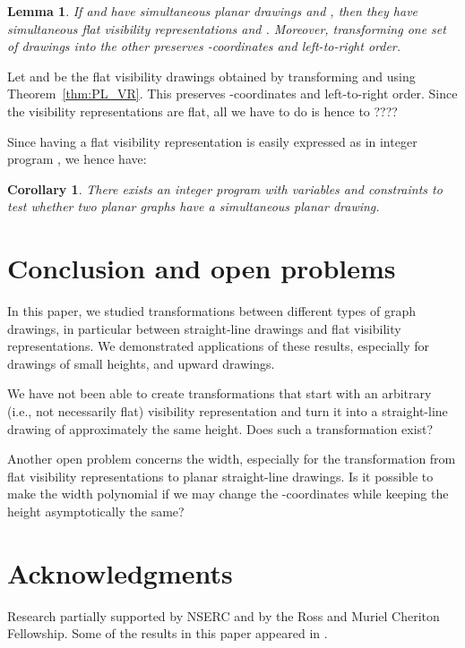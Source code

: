 \documentclass{elsarticle}
\newtheorem{lemma}{Lemma}
\newtheorem{corollary}{Corollary}
\newenvironment{proof}{{\bf Proof: }}{\hspace*{\fill}\medskip}
\begin{document}
\begin{lemma}
\label{lem:SL_VR_simultaneous}
If  and  have simultaneous planar drawings  and ,
then they have simultaneous flat visibility representations 
and .
Moreover, transforming
one set of drawings into the other preserves -coordinates and
left-to-right order.
\end{lemma}
\begin{proof}
Let  and  be the flat visibility drawings obtained
by transforming  and  using Theorem~\ref{thm:PL_VR}.
This preserves -coordinates and left-to-right order.  Since the
visibility representations are flat, all we have to do is hence to
????
\end{proof}


Since having a flat visibility representation is easily expressed
as in integer program \cite{Bie-GD13}, we hence have:

\begin{corollary}
There exists an integer program with  variables and
constraints to test whether two planar graphs have a simultaneous
planar drawing.
\end{corollary}
\fi


\section{Conclusion and open problems}
\label{se:open}


In this paper, we studied transformations between different types
of graph drawings, in particular between straight-line drawings
and flat visibility representations.  We demonstrated applications
of these results, especially for drawings of small heights, and
upward drawings.

We have not been able to create transformations that start with an
arbitrary (i.e., not necessarily flat) visibility representation and
turn it into a straight-line drawing of approximately the same height.
Does such a transformation exist?


Another open problem concerns the width, especially for the transformation
from flat visibility representations to planar straight-line drawings.
Is it possible to make the width polynomial if we may change the
-coordinates while keeping the height asymptotically the same?

\section*{Acknowledgments}


Research partially supported by NSERC and by the Ross and Muriel
Cheriton Fellowship.  Some of the results in this paper appeared
in \cite{Bie-WAOA12}.



\end{document}
